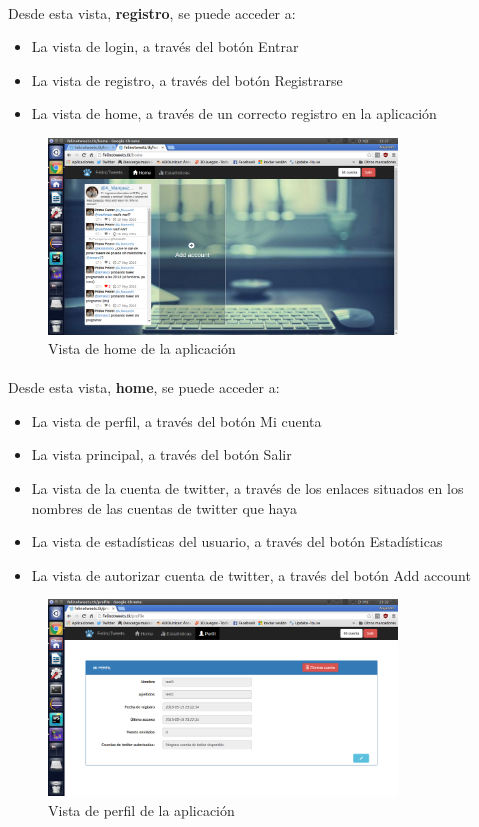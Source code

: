 \documentclass[a4paper]{article}
\begin{document}
\paragraph{} Desde esta vista, \textbf{registro}, se puede acceder a:
\begin{itemize}
	\item La vista de login, a través del botón Entrar
	\item La vista de registro, a través del botón Registrarse
	\item La vista de home, a través de un correcto registro en la aplicación
\end{itemize}
\begin{figure}[H]
	\centering
	\includegraphics[width=350px]{img/home-twitter.png}
	\caption{Vista de home de la aplicación}
	\label{fig:diagarq}
\end{figure}
\paragraph{} Desde esta vista, \textbf{home}, se puede acceder a:
\begin{itemize}
	\item La vista de perfil, a través del botón Mi cuenta
	\item La vista principal, a través del botón Salir
	\item La vista de la cuenta de twitter, a través de los enlaces situados en los nombres de las cuentas de twitter que haya
	\item La vista de estadísticas del usuario, a través del botón Estadísticas
	\item La vista de autorizar cuenta de twitter, a través del botón Add account
\end{itemize}
\begin{figure}[H]
	\centering
	\includegraphics[width=350px]{img/profile.png}
	\caption{Vista de perfil de la aplicación}
	\label{fig:diagarq}
\end{figure}
\end{document}
